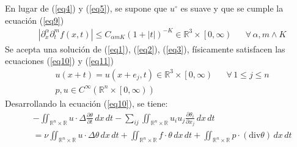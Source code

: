 En lugar de (\ref{eq4}) y (\ref{eq5}), se supone que $u^{\circ}$ es suave y que se cumple la ecuación (\ref{eq9})
\begin{align}
    &\left\lvert \partial_x^{\alpha}\partial_t^{m} f(x,t) \right\rvert\leq C_{\alpha m K}\left(1 + \left\lvert t \right\rvert \right)^{-K}\in \mathbb{R}^3\times \left[ 0,\infty \right)&& \forall\, \alpha, m \land K 
    \label{eq9}
\end{align}
Se acepta una solución de (\ref{eq1}), (\ref{eq2}), (\ref{eq3}), físicamente satisfacen las ecuaciones (\ref{eq10}) y (\ref{eq11})
\begin{align}
    &u(x + t) = u(x + e_j,t)\in \mathbb{R}^3 \times  \left[0,\infty \right)&& \forall\, 1\leq j\leq n\label{eq10}\\
    & p,u\in C^{\infty}\left(\mathbb{R}^n \times \left[0,\infty \right) \right)
    \label{eq11}
\end{align}
Desarrollando la ecuación (\ref{eq10}), se tiene:
\begin{align*}
&- \iint_{\mathbb{R}^n \times \mathbb{R}} u \cdot \Delta \frac{\partial \theta}{\partial t} \, dx\, dt - \sum_{ij} \iint_{\mathbb{R}^n \times \mathbb{R}} u_i u_j \frac{\partial \theta_i}{\partial x_j}\,dx\,dt\\
&= \nu \iint_{\mathbb{R}^n \times \mathbb{R}} u \cdot  \Delta \theta\, dx\,dt + \iint_{\mathbb{R}^n \times \mathbb{R}} f \cdot \theta \, dx\, dt + \iint_{\mathbb{R}^n \times \mathbb{R}} p \cdot (\text{div}\theta)\,dx\,dt
\end{align*}
